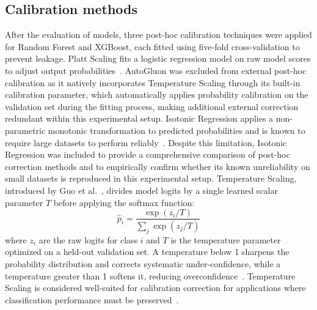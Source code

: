 \documentclass[conference]{IEEEtran}
\begin{document}
\subsection{Calibration methods}
After the evaluation of models, three post-hoc calibration
techniques were applied for Random Forest and XGBoost,
each fitted using five-fold cross-validation to prevent leakage.
Platt Scaling fits a logistic regression model on raw model
scores to adjust output probabilities~\cite{b12}.
AutoGluon was excluded from external post-hoc calibration
as it natively incorporates Temperature Scaling through its
built-in calibration parameter, which automatically applies
probability calibration on the validation set during the
fitting process, making additional external correction
redundant within this experimental setup.
Isotonic Regression applies a non-parametric monotonic
transformation to predicted probabilities and is known to
require large datasets to perform reliably~\cite{b12}.
Despite this limitation, Isotonic Regression was included to
provide a comprehensive comparison of post-hoc correction
methods and to empirically confirm whether its known
unreliability on small datasets is reproduced in this
experimental setup.
Temperature Scaling, introduced by Guo et al.~\cite{b9},
divides model logits by a single learned scalar parameter $T$
before applying the softmax function:
\begin{equation}
\hat{p}_i = \frac{\exp(z_i/T)}{\sum_j \exp(z_j/T)}
\end{equation}
where $z_i$ are the raw logits for class $i$ and $T$ is the
temperature parameter optimized on a held-out validation set.
A temperature below 1 sharpens the probability distribution
and corrects systematic under-confidence, while a temperature
greater than 1 softens it, reducing overconfidence~\cite{b9}.
Temperature Scaling is considered well-suited for calibration
correction for applications where classification performance
must be preserved~\cite{b9}.
\end{document}
